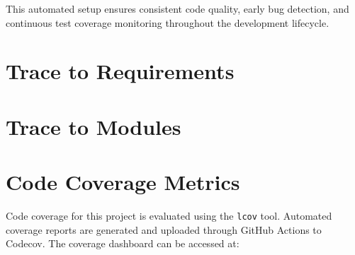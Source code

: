 \documentclass[12pt, titlepage]{article}
\begin{document}
This automated setup ensures consistent code quality, early bug detection, and
continuous test coverage monitoring throughout the development lifecycle.
		
\section{Trace to Requirements\label{sec:T2R}}

\begin{table}[htbp!]
  \centering
  \caption{Traceability Matrix Showing the Connections Between Requirements and System Test Cases}
  \label{Table:tc_trace}
\end{table}
		
\section{Trace to Modules\label{sec:T2M}}		

\section{Code Coverage Metrics}

Code coverage for this project is evaluated using the \texttt{lcov} tool.
Automated coverage reports are generated and uploaded through GitHub Actions to
Codecov. The coverage dashboard can be accessed at:
\end{document}
